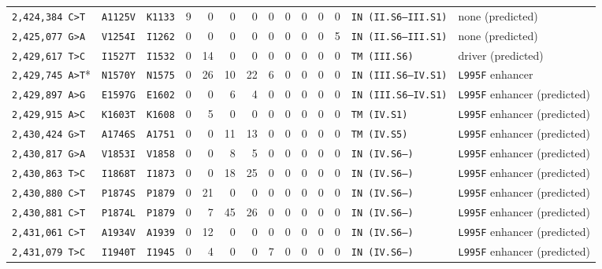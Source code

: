\begin{tabular}{lllrrrrrrrrrll}
\texttt{2,424,384 C>T} & \texttt{A1125V} & \texttt{K1133} & 9 & 0 & 0 & 0 & 0 & 0 & 0 & 0 & 0 & \texttt{IN (II.S6--III.S1)} & none (predicted) \\

\texttt{2,425,077 G>A} & \texttt{V1254I} & \texttt{I1262} & 0 & 0 & 0 & 0 & 0 & 0 & 0 & 0 & 5 & \texttt{IN (II.S6--III.S1)} & none (predicted) \\

\texttt{2,429,617 T>C} & \texttt{I1527T} & \texttt{I1532} & 0 & 14 & 0 & 0 & 0 & 0 & 0 & 0 & 0 & \texttt{TM (III.S6)} & driver (predicted) \\

\texttt{2,429,745 A>T}* & \texttt{N1570Y} & \texttt{N1575} & 0 & 26 & 10 & 22 & 6 & 0 & 0 & 0 & 0 & \texttt{IN (III.S6--IV.S1)} & \texttt{L995F} enhancer \\

\texttt{2,429,897 A>G} & \texttt{E1597G} & \texttt{E1602} & 0 & 0 & 6 & 4 & 0 & 0 & 0 & 0 & 0 & \texttt{IN (III.S6--IV.S1)} & \texttt{L995F} enhancer (predicted) \\

\texttt{2,429,915 A>C} & \texttt{K1603T} & \texttt{K1608} & 0 & 5 & 0 & 0 & 0 & 0 & 0 & 0 & 0 & \texttt{TM (IV.S1)} & \texttt{L995F} enhancer (predicted) \\

\texttt{2,430,424 G>T} & \texttt{A1746S} & \texttt{A1751} & 0 & 0 & 11 & 13 & 0 & 0 & 0 & 0 & 0 & \texttt{TM (IV.S5)} & \texttt{L995F} enhancer (predicted) \\

\texttt{2,430,817 G>A} & \texttt{V1853I} & \texttt{V1858} & 0 & 0 & 8 & 5 & 0 & 0 & 0 & 0 & 0 & \texttt{IN (IV.S6--)} & \texttt{L995F} enhancer (predicted) \\

\texttt{2,430,863 T>C} & \texttt{I1868T} & \texttt{I1873} & 0 & 0 & 18 & 25 & 0 & 0 & 0 & 0 & 0 & \texttt{IN (IV.S6--)} & \texttt{L995F} enhancer (predicted) \\

\texttt{2,430,880 C>T} & \texttt{P1874S} & \texttt{P1879} & 0 & 21 & 0 & 0 & 0 & 0 & 0 & 0 & 0 & \texttt{IN (IV.S6--)} & \texttt{L995F} enhancer (predicted) \\

\texttt{2,430,881 C>T} & \texttt{P1874L} & \texttt{P1879} & 0 & 7 & 45 & 26 & 0 & 0 & 0 & 0 & 0 & \texttt{IN (IV.S6--)} & \texttt{L995F} enhancer (predicted) \\

\texttt{2,431,061 C>T} & \texttt{A1934V} & \texttt{A1939} & 0 & 12 & 0 & 0 & 0 & 0 & 0 & 0 & 0 & \texttt{IN (IV.S6--)} & \texttt{L995F} enhancer (predicted) \\

\texttt{2,431,079 T>C} & \texttt{I1940T} & \texttt{I1945} & 0 & 4 & 0 & 0 & 7 & 0 & 0 & 0 & 0 & \texttt{IN (IV.S6--)} & \texttt{L995F} enhancer (predicted) \\

\bottomrule
\end{tabular}
